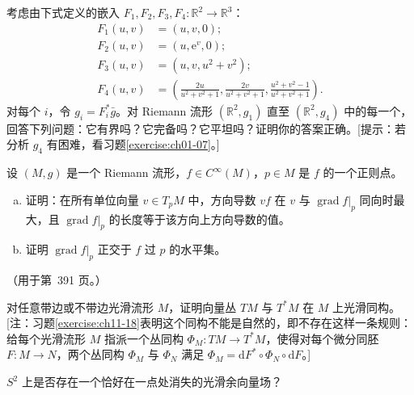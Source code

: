 \documentclass[../../main.tex]{subfiles}
\begin{document}
\begin{exercise}\label{exercise:ch13-20}
考虑由下式定义的嵌入 $F_1,F_2,F_3,F_4:\mathbb{R}^2\to\mathbb{R}^3$：
\begin{align*}
F_1(u,v)&=(u,v,0);\\
F_2(u,v)&=(u,\mathrm{e}^v,0);\\
F_3(u,v)&=(u,v,u^2+v^2);\\
F_4(u,v)&=\left(\frac{2u}{u^2+v^2+1},\frac{2v}{u^2+v^2+1},\frac{u^2+v^2-1}{u^2+v^2+1}\right).
\end{align*}
对每个 $i$，令 $g_i=F_i^*\bar g$。对 Riemann 流形 $(\mathbb{R}^2,g_1)$ 直至 $(\mathbb{R}^2,g_4)$ 中的每一个，回答下列问题：它有界吗？它完备吗？它平坦吗？证明你的答案正确。[提示：若分析 $g_4$ 有困难，看习题\ref{exercise:ch01-07}。]
\end{exercise}

\begin{exercise}\label{exercise:ch13-21}
设 $(M,g)$ 是一个 Riemann 流形，$f\in C^\infty(M)$，$p\in M$ 是 $f$ 的一个正则点。
\begin{enumerate}[(a)]
\item 证明：在所有单位向量 $v\in T_pM$ 中，方向导数 $vf$ 在 $v$ 与 $\operatorname{grad}f|_p$ 同向时最大，且 $\operatorname{grad}f|_p$ 的长度等于该方向上方向导数的值。
\item 证明 $\operatorname{grad}f|_p$ 正交于 $f$ 过 $p$ 的水平集。
\end{enumerate}
（用于第~391 页。）
\end{exercise}

\begin{exercise}\label{exercise:ch13-22}
对任意带边或不带边光滑流形 $M$，证明向量丛 $TM$ 与 $T^*M$ 在 $M$ 上光滑同构。[注：习题\ref{exercise:ch11-18}表明这个同构不能是自然的，即不存在这样一条规则：给每个光滑流形 $M$ 指派一个丛同构 $\Phi_M:TM\to T^*M$，使得对每个微分同胚 $F:M\to N$，两个丛同构 $\Phi_M$ 与 $\Phi_N$ 满足 $\Phi_M=\mathrm{d}F^*\circ\Phi_N\circ\mathrm{d}F$。]
\end{exercise}

\begin{exercise}\label{exercise:ch13-23}
$S^2$ 上是否存在一个恰好在一点处消失的光滑余向量场？
\end{exercise}
\end{document}
